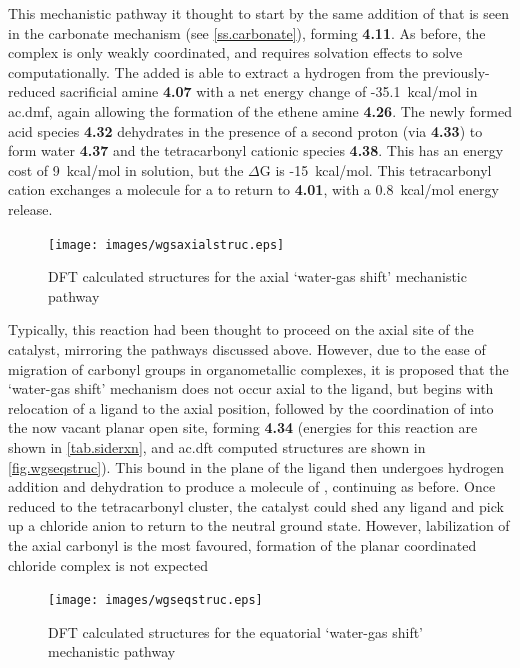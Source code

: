 This mechanistic pathway it thought to start by the same addition of  that is seen in the carbonate mechanism (see \autoref{ss.carbonate}), forming \textbf{4.11}. As before, the complex is only weakly coordinated, and requires solvation effects to solve computationally. The added  is able to extract a hydrogen from the previously-reduced sacrificial amine \textbf{4.07} with a net energy change of -35.1~kcal/mol in \gls{ac.dmf}, again allowing the formation of the ethene amine \textbf{4.26}. The newly formed acid species \textbf{4.32} dehydrates in the presence of a second proton (via \textbf{4.33}) to form water \textbf{4.37} and the tetracarbonyl cationic species \textbf{4.38}. This has an energy cost of 9~kcal/mol in solution, but the $\Delta$G is -15~kcal/mol. This tetracarbonyl cation exchanges a  molecule for a  to return to \textbf{4.01}, with a 0.8~kcal/mol energy release.

\begin{figure}[!ht]
 \begin{center}
  \texttt{[image: images/wgsaxialstruc.eps]}
 \end{center}
\caption{DFT calculated structures for the axial `water-gas shift' mechanistic pathway}
\label{fig.wgsaxstruc}
\end{figure} 

Typically, this reaction had been thought to proceed on the axial site of the catalyst, mirroring the pathways discussed above. However, due to the ease of migration of carbonyl groups in organometallic complexes, it is proposed that the `water-gas shift' mechanism does not occur axial to the ligand, but begins with relocation of a  ligand to the axial position, followed by the coordination of  into the now vacant planar open site, forming \textbf{4.34} (energies for this reaction are shown in \autoref{tab.siderxn}, and \gls{ac.dft} computed structures are shown in \autoref{fig.wgseqstruc}). This  bound in the plane of the ligand then undergoes hydrogen addition and dehydration to produce a molecule of , continuing as before. Once reduced to the tetracarbonyl cluster, the catalyst could shed any  ligand and pick up a chloride anion to return to the neutral ground state. However, labilization of the axial carbonyl is the most favoured, formation of the planar coordinated chloride complex is not expected\autocite{shaver1992}


\begin{figure}[!ht]
 \begin{center}
  \texttt{[image: images/wgseqstruc.eps]}
 \end{center}
\caption{DFT calculated structures for the equatorial `water-gas shift' mechanistic pathway}
\label{fig.wgseqstruc}
\end{figure} 

